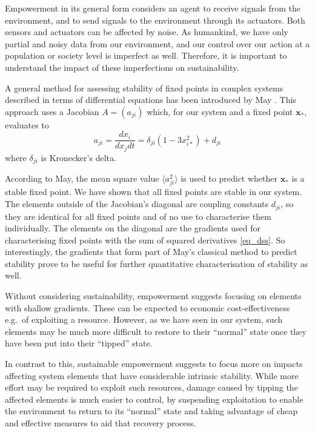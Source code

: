 \documentclass[conference]{IEEEtran}
\newcommand{\vectorsym}[1]{\ensuremath{\mathbf{#1}}}
\newcommand{\couplingconstant}{\ensuremath{d}}
\begin{document}
Empowerment in its general form considers an agent to receive signals
from the environment, and to send signals to the environment through
its actuators. Both sensors and actuators can be affected by noise. As
humankind, we have only partial and noisy data from our environment,
and our control over our action at a population or society level is
imperfect as well. Therefore, it is important to understand the impact
of these imperfections on sustainability.

A general method for assessing stability of fixed points in complex
systems described in terms of differential equations has been
introduced by May \cite{May1972_stablelargecomplexsystem}. This
approach uses a Jacobian $A = (a_{ji})$ which, for our system and a
fixed point $\vectorsym{x}_*$, evaluates to
\begin{equation}
  \label{eq_jacobian}
  a_{ji} = \frac{d x_i}{d x_j d t} = \delta_{ji} (1 - 3 x_{i*}^2) + \couplingconstant_{ji}
\end{equation}
where $\delta_{ji}$ is Kronecker's delta.

According to May, the mean square value $\langle a_{ji}^2 \rangle$ is
used to predict whether $\vectorsym{x}_*$ is a stable fixed point. We
have shown that all fixed points are stable in our system. The
elements outside of the Jacobian's diagonal are coupling constants
$\couplingconstant_{ji}$, so they are identical for all fixed points
and of no use to characterise them individually. The elements on the
diagonal are the gradients used for characterising fixed points with
the sum of squared derivatives \eqref{eq_dss}. So interestingly, the
gradients that form part of May's classical method to predict
stability prove to be useful for further quantitative characterisation
of stability as well.

Without considering sustainability, empowerment suggests focusing on
elements with shallow gradients. These can be expected to economic
cost-effectiveness e.g.\ of exploiting a resource. However, as we have
seen in our system, such elements may be much more difficult to
restore to their ``normal'' state once they have been put into their
``tipped'' state.

In contrast to this, sustainable empowerment suggests to focus more on
impacts affecting system elements that have considerable intrinsic
stability. While more effort may be required to exploit such
resources, damage caused by tipping the affected elements is much
easier to control, by suspending exploitation to enable the
environment to return to its ``normal'' state and taking advantage of
cheap and effective measures to aid that recovery process.
\end{document}
